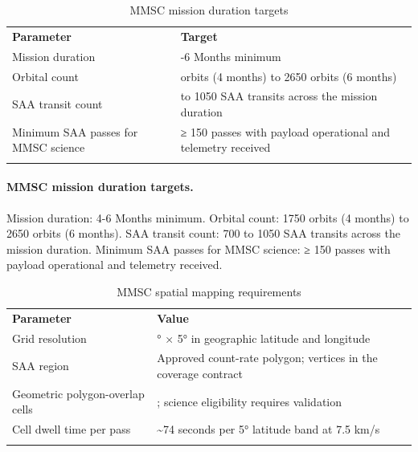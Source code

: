 \ifrequirementsedition
\begin{longtable}{@{}
  >{\raggedright\arraybackslash}p{}
  >{\raggedright\arraybackslash}p{}@{}}
\caption{MMSC mission duration targets}\label{tab:01-mission-context-1}\\
\toprule\noalign{}
\textbf{Parameter} & \textbf{Target} \\
Mission duration & 4-6 Months minimum \\
Orbital count & 1750 orbits (4 months) to 2650 orbits (6 months) \\
SAA transit count & 700 to 1050 SAA transits across the mission duration \\
Minimum SAA passes for MMSC science & ≥ 150 passes with payload operational and telemetry received \\
\midrule\noalign{}
\endhead
\bottomrule\noalign{}
\endlastfoot
\end{longtable}
\else
\paragraph{MMSC mission duration targets.} Mission duration: 4-6 Months minimum. Orbital count: 1750 orbits (4 months) to 2650 orbits (6 months). SAA transit count: 700 to 1050 SAA transits across the mission duration. Minimum SAA passes for MMSC science: ≥ 150 passes with payload operational and telemetry received.
\fi

\ifrequirementsedition
\begin{longtable}{@{}
  >{\raggedright\arraybackslash}p{}
  >{\raggedright\arraybackslash}p{}@{}}
\caption{MMSC spatial mapping requirements}\label{tab:01-mission-context-2}\\
\toprule\noalign{}
\textbf{Parameter} & \textbf{Value} \\
Grid resolution & 5° × 5° in geographic latitude and longitude \\
SAA region & Approved count-rate polygon; vertices in the coverage contract \\
Geometric polygon-overlap cells & 92; science eligibility requires validation \\
Cell dwell time per pass & \textasciitilde74 seconds per 5° latitude band at 7.5 km/s \\
\midrule\noalign{}
\endhead
\bottomrule\noalign{}
\endlastfoot
\end{longtable}
\else
